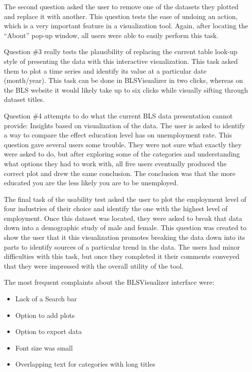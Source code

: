 \documentclass[journal]{IEEEtran}
\begin{document}
{The second question asked the user to remove one of the datasets they plotted and replace it with another. This question tests the ease of undoing an action, which is a very important feature in a visualization tool. Again, after locating the ``About'' pop-up window, all users were able to easily perform this task. 

Question \#3 really tests the plausibility of replacing the current table look-up style of presenting the data with this interactive visualization. This task asked them to plot a time series and identify its value at a particular date (month/year). This task can be done in BLSVisualizer in two clicks, whereas on the BLS website it would likely take up to six clicks while visually sifting through dataset titles. 

Question \#4 attempts to do what the current BLS data presentation cannot provide: Insights based on visualization of the data. The user is asked to identify a way to compare the effect education level has on unemployment rate. This question gave several users some trouble. They were not sure what exactly they were asked to do, but after exploring some of the categories and understanding what options they had to work with, all five users eventually produced the correct plot and drew the same conclusion. The conclusion was that the more educated you are the less likely you are to be unemployed. 

The final task of the usability test asked the user to plot the employment level of four industries of their choice and identify the one with the highest level of employment. Once this dataset was located, they were asked to break that data down into a demographic study of male and female. This question was created to show the user that it this visualization promotes breaking the data down into its parts to identify sources of a particular trend in the data. The users had minor difficulties with this task, but once they completed it their comments conveyed that they were impressed with the overall utility of the tool. 


The most frequent complaints about the BLSVisualizer interface were:
\begin{itemize}
  \item Lack of a Search bar
  \item Option to add plots
  \item Option to export data
  \item Font size was small
  \item Overlapping text for categories with long titles
\end{itemize} }
\end{document}

